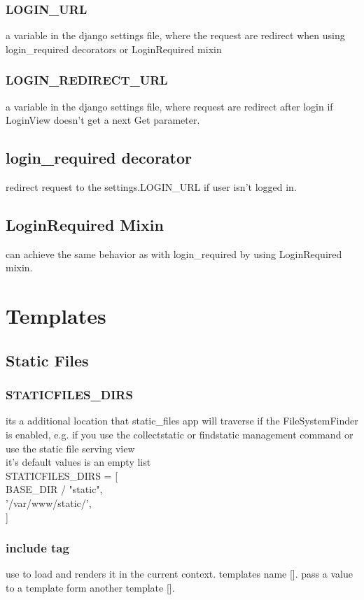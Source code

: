 \documentclass{article}
\begin{document}
			\subsubsection{LOGIN\_URL}
				a variable in the django settings file, where the request are redirect when using login\_required decorators or LoginRequired mixin
				
			\subsubsection{LOGIN\_REDIRECT\_URL}
				a variable in the django settings file, where request are redirect after login if LoginView doesn't get a next Get parameter.
		\subsection{login\_required decorator}
			redirect request to the settings.LOGIN\_URL if user isn't logged in.
		
		\subsection{LoginRequired Mixin}
			can achieve the same behavior as with login\_required by using LoginRequired mixin.
	\section{Templates}
		\subsection{Static Files}
			\subsubsection{STATICFILES\_DIRS}
				its a additional location that static\_files app will traverse if the FileSystemFinder is enabled, e.g. if you use the collectstatic or findstatic management command or use the static file serving view\\
				it's default values is an empty list\\
				STATICFILES\_DIRS = [\\
				BASE\_DIR / "static",\\
				'/var/www/static/',\\
				]\\
			
			\subsubsection{include tag}
				use to load and renders it in the current context.
				templates name [].
				pass a value to a template form another template [].
\end{document}
